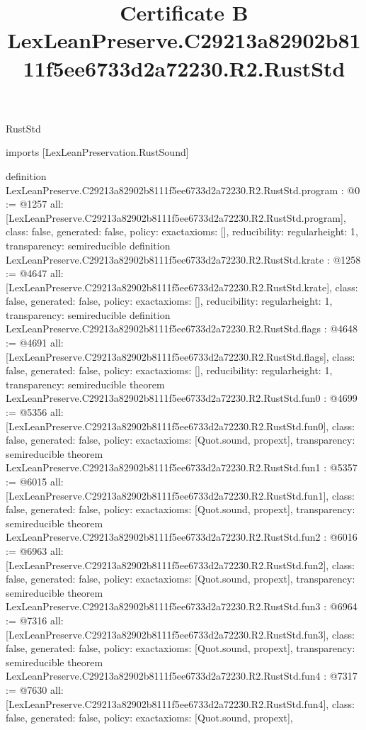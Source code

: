 \begin{lexlean}{RustStd}
\title{Certificate B LexLeanPreserve.C29213a82902b8111f5ee6733d2a72230.R2.RustStd}
\begin{coremodule}
imports [LexLeanPreservation.RustSound]

definition LexLeanPreserve.C29213a82902b8111f5ee6733d2a72230.R2.RustStd.program : @0 := @1257 {
  all: [LexLeanPreserve.C29213a82902b8111f5ee6733d2a72230.R2.RustStd.program],
  class: false,
  generated: false,
  policy: exact{axioms: []},
  reducibility: regular{height: 1},
  transparency: semireducible
}
definition LexLeanPreserve.C29213a82902b8111f5ee6733d2a72230.R2.RustStd.krate : @1258 := @4647 {
  all: [LexLeanPreserve.C29213a82902b8111f5ee6733d2a72230.R2.RustStd.krate],
  class: false,
  generated: false,
  policy: exact{axioms: []},
  reducibility: regular{height: 1},
  transparency: semireducible
}
definition LexLeanPreserve.C29213a82902b8111f5ee6733d2a72230.R2.RustStd.flags : @4648 := @4691 {
  all: [LexLeanPreserve.C29213a82902b8111f5ee6733d2a72230.R2.RustStd.flags],
  class: false,
  generated: false,
  policy: exact{axioms: []},
  reducibility: regular{height: 1},
  transparency: semireducible
}
theorem LexLeanPreserve.C29213a82902b8111f5ee6733d2a72230.R2.RustStd.fun0 : @4699 := @5356 {
  all: [LexLeanPreserve.C29213a82902b8111f5ee6733d2a72230.R2.RustStd.fun0],
  class: false,
  generated: false,
  policy: exact{axioms: [Quot.sound, propext]},
  transparency: semireducible
}
theorem LexLeanPreserve.C29213a82902b8111f5ee6733d2a72230.R2.RustStd.fun1 : @5357 := @6015 {
  all: [LexLeanPreserve.C29213a82902b8111f5ee6733d2a72230.R2.RustStd.fun1],
  class: false,
  generated: false,
  policy: exact{axioms: [Quot.sound, propext]},
  transparency: semireducible
}
theorem LexLeanPreserve.C29213a82902b8111f5ee6733d2a72230.R2.RustStd.fun2 : @6016 := @6963 {
  all: [LexLeanPreserve.C29213a82902b8111f5ee6733d2a72230.R2.RustStd.fun2],
  class: false,
  generated: false,
  policy: exact{axioms: [Quot.sound, propext]},
  transparency: semireducible
}
theorem LexLeanPreserve.C29213a82902b8111f5ee6733d2a72230.R2.RustStd.fun3 : @6964 := @7316 {
  all: [LexLeanPreserve.C29213a82902b8111f5ee6733d2a72230.R2.RustStd.fun3],
  class: false,
  generated: false,
  policy: exact{axioms: [Quot.sound, propext]},
  transparency: semireducible
}
theorem LexLeanPreserve.C29213a82902b8111f5ee6733d2a72230.R2.RustStd.fun4 : @7317 := @7630 {
  all: [LexLeanPreserve.C29213a82902b8111f5ee6733d2a72230.R2.RustStd.fun4],
  class: false,
  generated: false,
  policy: exact{axioms: [Quot.sound, propext]},
}
\end{coremodule}
\end{lexlean}
